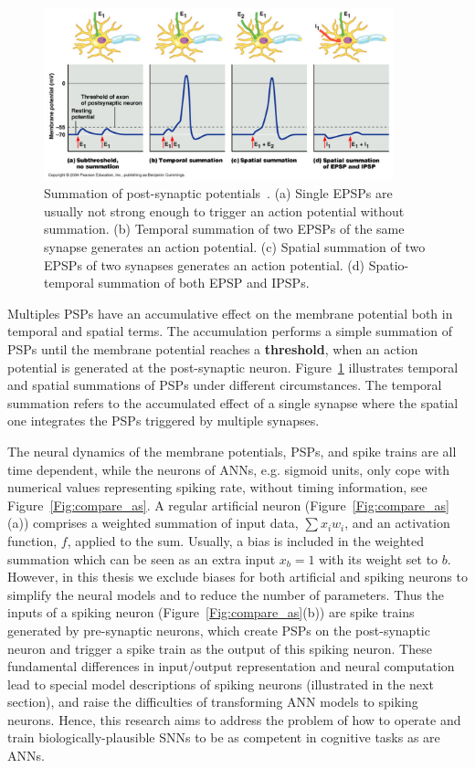 \begin{figure}[b!]
	\centering
	\includegraphics[width=0.9\textwidth]{pics_snn/psp.png}
	\caption[Summation of post-synaptic potentials~\citep{reece2011campbell}.]{Summation of post-synaptic potentials~\citep{reece2011campbell}. 
		(a) Single EPSPs are usually not strong enough to trigger an action potential without summation. (b) Temporal summation of two EPSPs of the same synapse generates an action potential. (c) Spatial summation of two EPSPs of two synapses generates an action potential. (d) Spatio-temporal summation of both EPSP and IPSPs.
	}
	\label{Fig:psp_sum}
\end{figure}

Multiples PSPs have an accumulative effect on the membrane potential both in temporal and spatial terms.
The accumulation performs a simple summation of PSPs until the membrane potential reaches a \textbf{threshold}, when an action potential is generated at the post-synaptic neuron.
Figure~\ref{Fig:psp_sum} illustrates temporal and spatial summations of PSPs under different circumstances.
The temporal summation refers to the accumulated effect of a single synapse where the spatial one integrates the PSPs triggered by multiple synapses.



The neural dynamics of the membrane potentials, PSPs, and spike trains are all time dependent, while the neurons of ANNs, e.g. sigmoid units, only cope with numerical values representing spiking rate, without timing information, see Figure~\ref{Fig:compare_as}.
A regular artificial neuron (Figure~\ref{Fig:compare_as}(a)) comprises a weighted summation of input data, $\sum x_i w_i$, and an activation function, $f$, applied to the sum. Usually, a bias is included in the weighted summation which can be seen as an extra input $x_b = 1$ with its weight set to $b$.
However, in this thesis we exclude biases for both artificial and spiking neurons to simplify the neural models and to reduce the number of parameters.
Thus the inputs of a spiking neuron (Figure~\ref{Fig:compare_as}(b)) are spike trains generated by pre-synaptic neurons, which create PSPs on the post-synaptic neuron and trigger a spike train as the output of this spiking neuron.
These fundamental differences in input/output representation and neural computation lead to special model descriptions of spiking neurons (illustrated in the next section), and raise the difficulties of transforming ANN models to spiking neurons.
Hence, this research aims to address the problem of how to operate and train biologically-plausible SNNs to be as competent in cognitive tasks as are ANNs.

